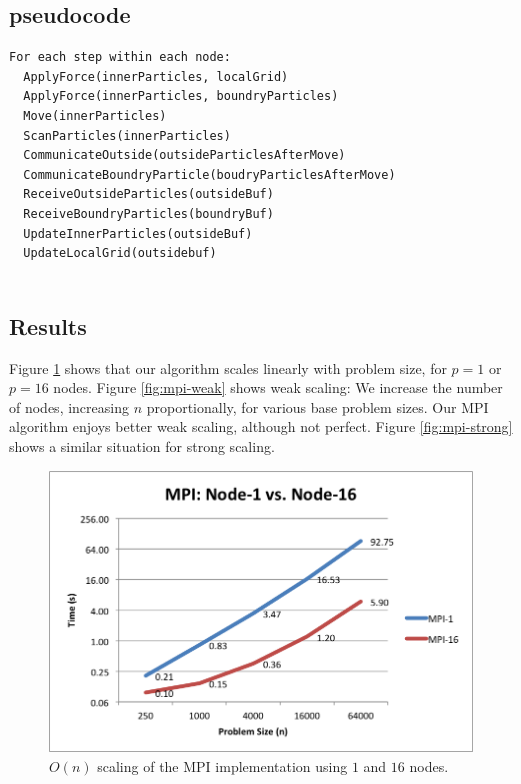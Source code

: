 \documentclass{article}
\begin{document}
\subsection{pseudocode}

\begin{verbatim}
For each step within each node:
  ApplyForce(innerParticles, localGrid)
  ApplyForce(innerParticles, boundryParticles)
  Move(innerParticles)
  ScanParticles(innerParticles)
  CommunicateOutside(outsideParticlesAfterMove)
  CommunicateBoundryParticle(boudryParticlesAfterMove)
  ReceiveOutsideParticles(outsideBuf)
  ReceiveBoundryParticles(boundryBuf)
  UpdateInnerParticles(outsideBuf)
  UpdateLocalGrid(outsidebuf)
  
\end{verbatim}

\subsection{Results}
Figure \ref{fig:mpi-on} shows that our algorithm scales linearly with problem size, for $p=1$ or $p=16$ nodes.  Figure \ref{fig:mpi-weak} shows weak scaling: We increase the number of nodes, increasing $n$ proportionally, for various base problem sizes.  Our MPI algorithm enjoys better weak scaling, although not perfect.  Figure \ref{fig:mpi-strong} shows a similar situation for strong scaling.

\begin{figure}
  \includegraphics[width=\textwidth]{plots/MPI-node1-vs-node16.png}
  \caption{$O(n)$ scaling of the MPI implementation using $1$ and $16$ nodes.}
  \label{fig:mpi-on}
\end{figure}
\end{document}
